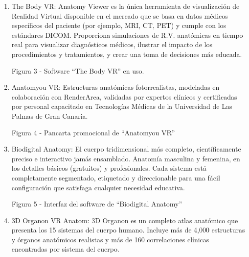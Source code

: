\begin{enumerate}
\item The Body VR: Anatomy Viewer es la única herramienta de visualización de Realidad Virtual disponible en el mercado que se basa en datos médicos específicos del paciente (por ejemplo, MRI, CT, PET) y cumple con los estándares DICOM. Proporciona simulaciones de R.V. anatómicas en tiempo real para visualizar diagnósticos médicos, ilustrar el impacto de los procedimientos y tratamientos, y crear una toma de decisiones más educada.

Figura 3 - Software “The Body VR” en uso.

\item Anatomyou VR: Estructuras anatómicas fotorrealistas, modeladas en colaboración con RenderArea, validadas por expertos clínicos y certificadas por personal capacitado en  Tecnologías Médicas de la Universidad de Las Palmas de Gran Canaria.

Figura 4 -  Pancarta promocional de “Anatomyou VR” 

\item Biodigital Anatomy: El cuerpo tridimensional más completo, científicamente preciso e interactivo jamás ensamblado. Anatomía masculina y femenina, en los detalles básicos (gratuitos) y profesionales. Cada sistema está completamente segmentado, etiquetado y direccionable para una fácil configuración que satisfaga cualquier necesidad educativa.


Figura 5 - Interfaz del software de “Biodigital Anatomy”

\item 3D Organon VR Anatom: 3D Organon es un completo atlas anatómico que presenta los 15 sistemas del cuerpo humano. Incluye más de 4,000 estructuras y órganos anatómicos realistas y más de 160 correlaciones clínicas encontradas por sistema del cuerpo.

\end{enumerate}

